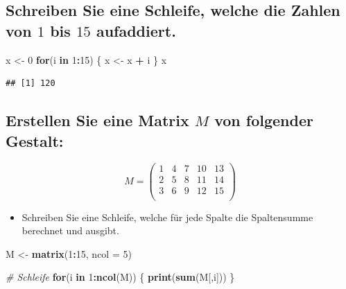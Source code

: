 \documentclass[12pt,a4paper]{article}
\newenvironment{Shaded}{\begin{snugshade}}{\end{snugshade}}
\newcommand{\AttributeTok}[1]{\textcolor[rgb]{0.13,0.29,0.53}{#1}}
\newcommand{\CommentTok}[1]{\textcolor[rgb]{0.56,0.35,0.01}{\textit{#1}}}
\newcommand{\ControlFlowTok}[1]{\textcolor[rgb]{0.13,0.29,0.53}{\textbf{#1}}}
\newcommand{\DecValTok}[1]{\textcolor[rgb]{0.00,0.00,0.81}{#1}}
\newcommand{\FunctionTok}[1]{\textcolor[rgb]{0.13,0.29,0.53}{\textbf{#1}}}
\newcommand{\NormalTok}[1]{#1}
\newcommand{\OtherTok}[1]{\textcolor[rgb]{0.56,0.35,0.01}{#1}}
\newcommand{\SpecialCharTok}[1]{\textcolor[rgb]{0.81,0.36,0.00}{\textbf{#1}}}
\begin{document}
\subsection{\texorpdfstring{Schreiben Sie eine Schleife, welche die
Zahlen von \(1\) bis \(15\)
aufaddiert.}{Schreiben Sie eine Schleife, welche die Zahlen von 1 bis 15 aufaddiert.}}\label{schreiben-sie-eine-schleife-welche-die-zahlen-von-1-bis-15-aufaddiert.}

\begin{Shaded}
\begin{Highlighting}[]
\NormalTok{    x }\OtherTok{\textless{}{-}} \DecValTok{0}
    \ControlFlowTok{for}\NormalTok{(i }\ControlFlowTok{in} \DecValTok{1}\SpecialCharTok{:}\DecValTok{15}\NormalTok{) \{}
\NormalTok{      x }\OtherTok{\textless{}{-}}\NormalTok{ x }\SpecialCharTok{+}\NormalTok{ i}
\NormalTok{    \}}
\NormalTok{    x}
\end{Highlighting}
\end{Shaded}

\begin{verbatim}
## [1] 120
\end{verbatim}

\subsection{\texorpdfstring{Erstellen Sie eine Matrix \(M\) von
folgender
Gestalt:}{Erstellen Sie eine Matrix M von folgender Gestalt:}}\label{erstellen-sie-eine-matrix-m-von-folgender-gestalt}

\[
M=\begin{pmatrix}
1 & 4 & 7 & 10 & 13\\
2 & 5 & 8 & 11 & 14\\
3 & 6 & 9 & 12 & 15\\
\end{pmatrix}
\]

\begin{itemize}
  \item Schreiben Sie eine Schleife, welche für jede Spalte die Spaltensumme berechnet und ausgibt.
\end{itemize}

\begin{Shaded}
\begin{Highlighting}[]
\NormalTok{    M }\OtherTok{\textless{}{-}} \FunctionTok{matrix}\NormalTok{(}\DecValTok{1}\SpecialCharTok{:}\DecValTok{15}\NormalTok{, }\AttributeTok{ncol =} \DecValTok{5}\NormalTok{)}
    
    \CommentTok{\# Schleife}
    \ControlFlowTok{for}\NormalTok{(i }\ControlFlowTok{in} \DecValTok{1}\SpecialCharTok{:}\FunctionTok{ncol}\NormalTok{(M)) \{}
      \FunctionTok{print}\NormalTok{(}\FunctionTok{sum}\NormalTok{(M[,i]))}
\NormalTok{    \}}
\end{Highlighting}
\end{Shaded}
\end{document}
